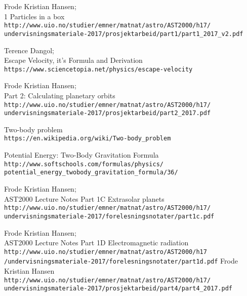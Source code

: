 \documentclass[11pt, A4paper, norsk]{report}
\begin{document}
	\begin{thebibliography}{9}
Frode Kristian Hansen; \\
1 Particles in a box \\
\texttt{http://www.uio.no/studier/emner/matnat/astro/AST2000/h17/ \\ undervisningsmateriale-2017/prosjektarbeid/part1/part1\_2017\_v2.pdf}

Terence Dangol; \\
Escape Velocity, it's Formula and Derivation \\
\texttt{https://www.sciencetopia.net/physics/escape-velocity}
		
Frode Kristian Hansen; \\
Part 2: Calculating planetary orbits \\
\texttt{http://www.uio.no/studier/emner/matnat/astro/AST2000/h17/ \\
undervisningsmateriale-2017/prosjektarbeid/part2\_2017.pdf}
		
Two-body problem \\
\texttt{https://en.wikipedia.org/wiki/Two-body\_problem}
		
Potential Energy: Two-Body Gravitation Formula \\
\texttt{http://www.softschools.com/formulas/physics/\\
potential\_energy\_twobody\_gravitation\_formula/36/}

Frode Kristian Hansen; \\
AST2000 Lecture Notes Part 1C Extrasolar planets \\
\texttt{http://www.uio.no/studier/emner/matnat/astro/AST2000/h17/ \\ undervisningsmateriale-2017/forelesningsnotater/part1c.pdf}

Frode Kristian Hansen; \\
AST2000 Lecture Notes Part 1D Electromagnetic radiation
\texttt{http://www.uio.no/studier/emner/matnat/astro/AST2000/h17 \\ /undervisningsmateriale-2017/forelesningsnotater/part1d.pdf}
Frode Kristian Hansen
\texttt{http://www.uio.no/studier/emner/matnat/astro/AST2000/h17/\\undervisningsmateriale-2017/prosjektarbeid/part4/part4\_2017.pdf}
	\end{thebibliography}
\end{document}
